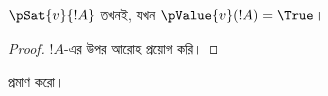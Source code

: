 \documentclass[../../../include/open-logic-section]{subfiles}
\begin{document}
\begin{prop}
  $\pSat{v}{!A}$ তখনই, যখন $\pValue{v}(!A) = \True$।
\end{prop}

\begin{proof}
  $!A$-এর উপর আরোহ প্রয়োগ করি।
\end{proof}

\begin{prob}
   প্রমাণ করো।
\end{prob}
\end{document}
